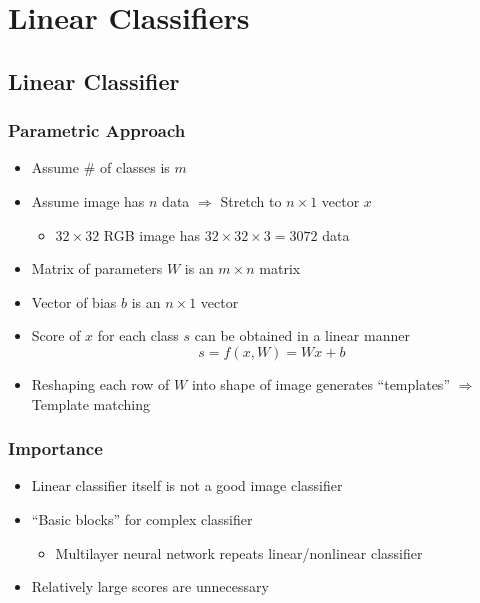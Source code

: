 \section{Linear Classifiers}

\subsection{Linear Classifier}

\subsubsection*{Parametric Approach}
\begin{itemize}
    \item Assume \# of classes is $m$
    \item Assume image has $n$ data $\Rightarrow$ Stretch to $n\times 1$ vector $x$
    \begin{itemize}
        \item $32\times 32$ RGB image has $32\times 32\times 3=3072$ data
    \end{itemize}
    \item Matrix of parameters $W$ is an $m\times n$ matrix
    \item Vector of bias $b$ is an $n\times 1$ vector
    \item Score of $x$ for each class $s$ can be obtained in a linear manner
    \begin{equation}
        s=f(x,W)=Wx+b
    \end{equation}
    \item Reshaping each row of $W$ into shape of image generates ``templates'' $\Rightarrow$ Template matching
\end{itemize}

\subsubsection*{Importance}
\begin{itemize}
    \item Linear classifier itself is not a good image classifier
    \item ``Basic blocks'' for complex classifier
    \begin{itemize}
        \item Multilayer neural network repeats linear/nonlinear classifier
    \end{itemize}
    \item Relatively large scores are unnecessary
\end{itemize}

